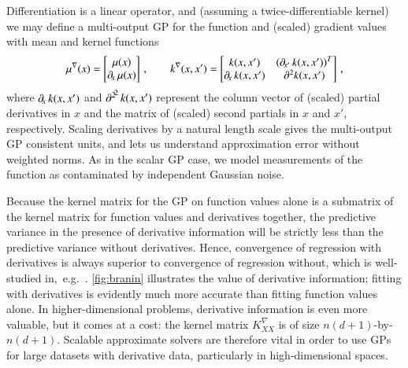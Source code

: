 Differentiation is a linear operator, and (assuming a twice-differentiable
kernel) we may define a multi-output GP for the function and (scaled) gradient
values with mean and kernel functions
\begin{equation}\label{eqn:meankernelderiv}
  \mu^{\nabla}(x) =
  \begin{bmatrix}
    \mu(x) \\ \operatorname{\partial\!}_x \mu(x)
  \end{bmatrix}\,, \qquad
  k^{\nabla}(x,x') =
  \begin{bmatrix}
    k(x,x') & \left( \operatorname{\partial\!}_{x'} k(x,x') \right)^T \\
    \operatorname{\partial\!}_x k(x,x') & \operatorname{\partial^2\!} k(x,x')
  \end{bmatrix}\,,
\end{equation}
where $\operatorname{\partial\!}_x k(x,x')$ and $\operatorname{\partial^2\!}^2 k(x,x')$ represent the column vector of 
(scaled) partial derivatives in $x$ and the matrix of (scaled) second partials
in $x$ and $x'$, respectively. Scaling derivatives by a natural length scale
gives the multi-output GP consistent units, and lets us understand approximation
error without weighted norms. As in the scalar GP case, we model measurements of
the function as contaminated by independent Gaussian noise.

Because the kernel matrix for the GP on function values alone is a submatrix
of the kernel matrix for function values and derivatives together, the
predictive variance in the presence of derivative information will be strictly
less than the predictive variance without derivatives. Hence, convergence of
regression with derivatives is always superior to convergence of regression
without, which is well-studied in,~e.g.~\cite[Chapter 7]{rasmussen06}. 
\cref{fig:branin} illustrates the value of derivative information; fitting with
derivatives is evidently much more accurate than fitting function values alone.
In higher-dimensional problems, derivative information is even more valuable,
but it comes at a cost: the kernel matrix $K^{\nabla}_{XX}$ is of size $n
(d+1)$-by-$n(d+1)$. Scalable approximate solvers are therefore vital in order
to use GPs for large datasets with derivative data, particularly in
high-dimensional spaces.

